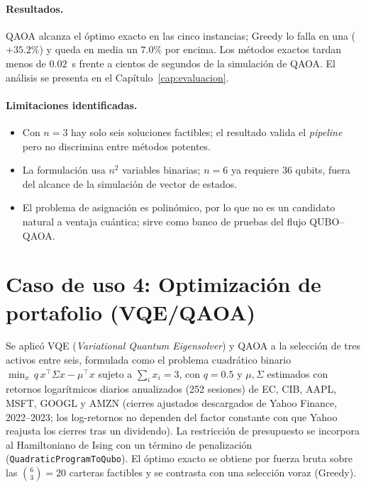 \paragraph{Resultados.}
QAOA alcanza el óptimo exacto en las cinco instancias; Greedy lo falla en una ($+35.2\%$) y queda en media un $7.0\%$ por encima. Los métodos exactos tardan menos de $0.02$~s frente a cientos de segundos de la simulación de QAOA. El análisis se presenta en el Capítulo~\ref{cap:evaluacion}.

\paragraph{Limitaciones identificadas.}
\begin{itemize}
  \item Con $n=3$ hay solo seis soluciones factibles; el resultado valida el \emph{pipeline} pero no discrimina entre métodos potentes.
  \item La formulación usa $n^2$ variables binarias; $n=6$ ya requiere 36 qubits, fuera del alcance de la simulación de vector de estados.
  \item El problema de asignación es polinómico, por lo que no es un candidato natural a ventaja cuántica; sirve como banco de pruebas del flujo QUBO--QAOA.
\end{itemize}

\section{Caso de uso 4: Optimización de portafolio (VQE/QAOA)}

Se aplicó VQE (\textit{Variational Quantum Eigensolver}) y QAOA a la selección de tres activos entre seis, formulada como el problema cuadrático binario $\min_x\, q\,x^\top\Sigma x-\mu^\top x$ sujeto a $\sum_i x_i=3$, con $q=0.5$ y $\mu,\Sigma$ estimados con retornos logarítmicos diarios anualizados (252 sesiones) de EC, CIB, AAPL, MSFT, GOOGL y AMZN (cierres ajustados descargados de Yahoo Finance, 2022--2023; los log-retornos no dependen del factor constante con que Yahoo reajusta los cierres tras un dividendo). La restricción de presupuesto se incorpora al Hamiltoniano de Ising con un término de penalización (\texttt{QuadraticProgramToQubo}). El óptimo exacto se obtiene por fuerza bruta sobre las $\binom{6}{3}=20$ carteras factibles y se contrasta con una selección voraz (Greedy).

